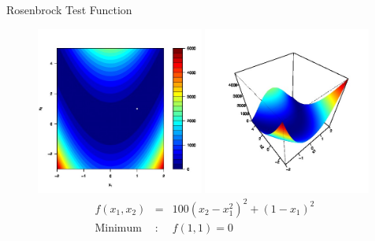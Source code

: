 \documentclass[ xcolor = pdftex, dvipsnames, table ]{beamer}
\begin{document}
\subsection{}
\begin{frame}{Rosenbrock Test Function}
\vspace{-0.3cm}
\begin{figure}[!h]%
        \centering
        \includegraphics[width=0.49\textwidth]{roseContour.jpg}
        \includegraphics[width=0.49\textwidth]{rosePersp.jpg}
	\vspace{-0.5cm}
        \begin{eqnarray}
        f(x_1, x_2) &=& 100\left(x_2-x_1^2\right)^2 + (1-x_1)^2 \nonumber\\
        \text{Minimum}&:& f(1, 1)=0\nonumber
        \end{eqnarray}
\end{figure}
\end{frame}

%
%
\end{document}
